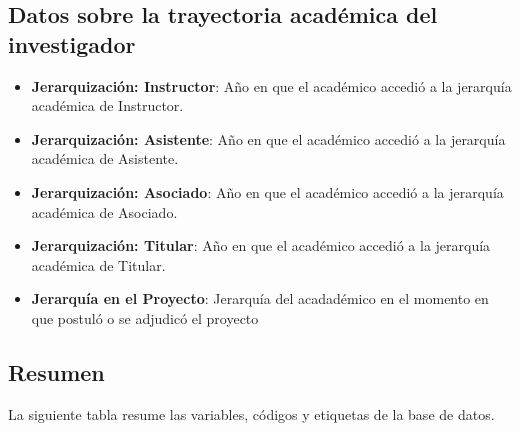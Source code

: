 \documentclass[
  spanish,
  letterpaper,
  DIV=11,
  numbers=noendperiod]{scrreprt}
\begin{document}
\subsection{Datos sobre la trayectoria académica del
investigador}\label{datos-sobre-la-trayectoria-acaduxe9mica-del-investigador}

\begin{itemize}
\item
  \textbf{Jerarquización: Instructor}: Año en que el académico accedió a
  la jerarquía académica de Instructor.
\item
  \textbf{Jerarquización: Asistente}: Año en que el académico accedió a
  la jerarquía académica de Asistente.
\item
  \textbf{Jerarquización: Asociado}: Año en que el académico accedió a
  la jerarquía académica de Asociado.
\item
  \textbf{Jerarquización: Titular}: Año en que el académico accedió a la
  jerarquía académica de Titular.
\item
  \textbf{Jerarquía en el Proyecto}: Jerarquía del acadadémico en el
  momento en que postuló o se adjudicó el proyecto
\end{itemize}

\subsection{Resumen}\label{resumen}

La siguiente tabla resume las variables, códigos y etiquetas de la base
de datos.
\end{document}
